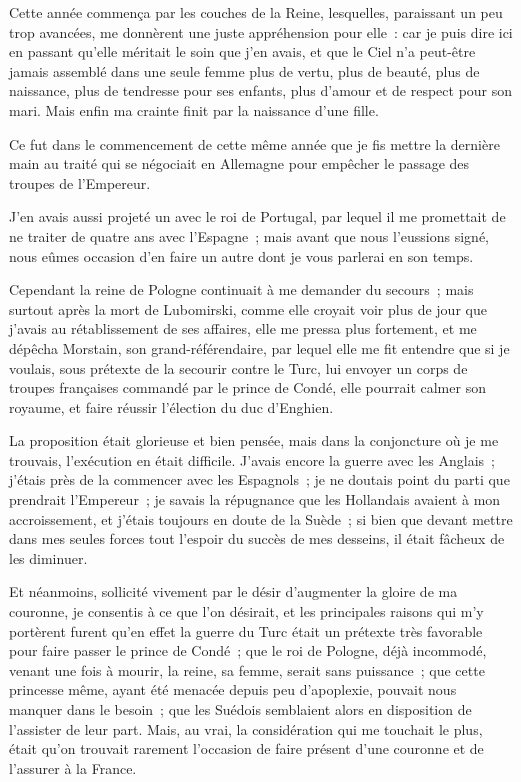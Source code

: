 \documentclass[french,twoside]{book} %
\begin{document}
\noindent Cette année commença par les couches de la Reine, lesquelles, paraissant un peu trop avancées, me donnèrent une juste appréhension pour elle : car je puis dire ici en passant qu’elle méritait le soin que j’en avais, et que le Ciel n’a peut-être jamais assemblé dans une seule femme plus de vertu, plus de beauté, plus de naissance, plus de tendresse pour ses enfants, plus d’amour et de respect pour son mari. Mais enfin ma crainte finit par la naissance d’une fille.\par
Ce fut dans le commencement de cette même année que je fis mettre la dernière main au traité qui se négociait en Allemagne pour empêcher le passage des troupes de l’Empereur.\par
J’en avais aussi projeté un avec le roi de Portugal, par lequel il me promettait de ne traiter de quatre ans avec l’Espagne ; mais avant que nous l’eussions signé, nous eûmes occasion d’en faire un autre dont je vous parlerai en son temps.\par
Cependant la reine de Pologne continuait à me demander du secours ; mais surtout après la mort de Lubomirski, comme elle croyait voir plus de jour que j’avais au rétablissement de ses affaires, elle me pressa plus fortement, et me dépêcha Morstain, son grand-référendaire, par lequel elle me fit entendre que si je voulais, sous prétexte de la secourir contre le Turc, lui envoyer un corps de troupes françaises commandé par le prince de Condé, elle pourrait calmer son royaume, et faire réussir l’élection du duc d’Enghien.\par
La proposition était glorieuse et bien pensée, mais dans la conjoncture où je me trouvais, l’exécution en était difficile. J’avais encore la guerre avec les Anglais ; j’étais près de la commencer avec les Espagnols ; je ne doutais point du parti que prendrait l’Empereur ; je savais la répugnance que les Hollandais avaient à mon accroissement, et j’étais toujours en doute de la Suède ; si bien que devant mettre dans mes seules forces tout l’espoir du succès de mes desseins, il était fâcheux de les diminuer.\par
Et néanmoins, sollicité vivement par le désir d’augmenter la gloire de ma couronne, je consentis à ce que l’on désirait, et les principales raisons qui m’y portèrent furent qu’en effet la guerre du Turc était un prétexte très favorable pour faire passer le prince de Condé ; que le roi de Pologne, déjà incommodé, venant une fois à mourir, la reine, sa femme, serait sans puissance ; que cette princesse même, ayant été menacée depuis peu d’apoplexie, pouvait nous manquer dans le besoin ; que les Suédois semblaient alors en disposition de l’assister de leur part. Mais, au vrai, la considération qui me touchait le plus, était qu’on trouvait rarement l’occasion de faire présent d’une couronne et de l’assurer à la France.\par
\end{document}

